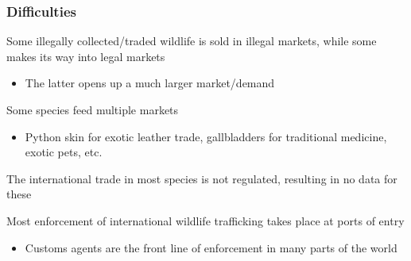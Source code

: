 \documentclass[10pt]{beamer}
\begin{document}
\begin{frame}[t]
\frametitle{Difficulties}
\vspace{0.25cm}

	Some illegally collected/traded wildlife is sold in illegal markets, while some makes its way into legal markets\\
		\begin{itemize}
			\item The latter opens up a much larger market/demand
		\end{itemize}
	
	\bigskip
	
	Some species feed multiple markets\\
		\begin{itemize}
			\item Python skin for exotic leather trade, gallbladders for traditional medicine, exotic pets, etc. 
		\end{itemize}
	
	\bigskip
	
	The international trade in most species is not regulated, resulting in no data for these\\
	
	\bigskip
	
	Most enforcement of international wildlife trafficking takes place at ports of entry
		\begin{itemize}
			\item Customs agents are the front line of enforcement in many parts of the world
		\end{itemize}
\end{frame}
\end{document}
